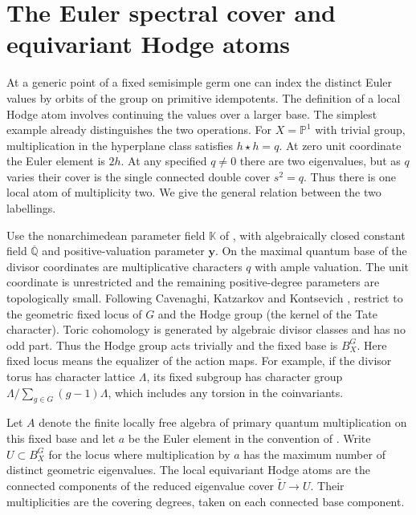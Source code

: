 \section{The Euler spectral cover and equivariant Hodge atoms}\label{sec:hodgeatoms}

At a generic point of a fixed semisimple germ one can index the distinct Euler values by orbits of the group on primitive idempotents. The definition of a local Hodge atom involves continuing the values over a larger base. The simplest example already distinguishes the two operations. For $X=\mathbb P^1$ with trivial group, multiplication in the hyperplane class satisfies $h\star h=q$. At zero unit coordinate the Euler element is $2h$. At any specified $q\ne0$ there are two eigenvalues, but as $q$ varies their cover is the single connected double cover $s^2=q$. Thus there is one local atom of multiplicity two. We give the general relation between the two labellings.

Use the nonarchimedean parameter field $\mathbb K$ of \cite[\S5.4]{KKPY}, with algebraically closed constant field $\overline{\mathbb Q}$ and positive-valuation parameter $\mathbf y$. On the maximal quantum base of \cite[\S3.5.2]{KKPY} the divisor coordinates are multiplicative characters $q$ with ample valuation. The unit coordinate is unrestricted and the remaining positive-degree parameters are topologically small. Following Cavenaghi, Katzarkov and Kontsevich \cite[Definition~2.3 and \S2.5]{CKK}, restrict to the geometric fixed locus of $G$ and the Hodge group (the kernel of the Tate character). Toric cohomology is generated by algebraic divisor classes and has no odd part. Thus the Hodge group acts trivially and the fixed base is $B_X^G$. Here fixed locus means the equalizer of the action maps. For example, if the divisor torus has character lattice $\Lambda$, its fixed subgroup has character group $\Lambda/\sum_{g\in G}(g-1)\Lambda$, which includes any torsion in the coinvariants.

Let $A$ denote the finite locally free algebra of primary quantum multiplication on this fixed base and let $a$ be the Euler element in the convention of \cite[\S2.1]{CKK}. Write $U\subset B_X^G$ for the locus where multiplication by $a$ has the maximum number of distinct geometric eigenvalues. The local equivariant Hodge atoms are the connected components of the reduced eigenvalue cover $\widetilde U\to U$. Their multiplicities are the covering degrees, taken on each connected base component.

